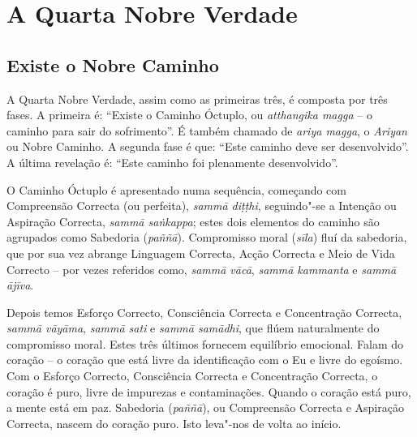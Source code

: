
\chapter{A Quarta Nobre Verdade}

\pagestyle{topbottomcorner}

\section{Existe o Nobre Caminho}

A Quarta Nobre Verdade, assim como as primeiras três, é composta por três fases.
A primeira é: “Existe o Caminho Óctuplo, ou \emph{atthangika magga} – o caminho
para sair do sofrimento”. É também chamado de \emph{ariya magga}, o
\emph{Ariyan} ou Nobre Caminho. A segunda fase é que: “Este caminho deve ser
desenvolvido”. A última revelação é: “Este caminho foi plenamente desenvolvido”.

O Caminho Óctuplo é apresentado numa sequência, começando com Compreensão
Correcta (ou perfeita), \emph{sammā diṭṭhi}, seguindo"-se a Intenção ou Aspiração
Correcta, \emph{sammā saṅkappa}; estes dois elementos do caminho são agrupados
como Sabedoria (\emph{paññā}). Compromisso moral (\emph{sīla}) fluí da
sabedoria, que por sua vez abrange Linguagem Correcta, Acção Correcta e Meio de
Vida Correcto – por vezes referidos como, \emph{sammā vācā}, \emph{sammā
  kammanta} e \emph{sammā ājīva}.

Depois temos Esforço Correcto, Consciência Correcta e Concentração Correcta,
\emph{sammā vāyāma}, \emph{sammā sati} e \emph{sammā samādhi}, que flúem
naturalmente do compromisso moral. Estes três últimos fornecem equilíbrio
emocional. Falam do coração – o coração que está livre da identificação com o Eu
e livre do egoísmo. Com o Esforço Correcto, Consciência Correcta e Concentração
Correcta, o coração é puro, livre de impurezas e contaminações. Quando o coração
está puro, a mente está em paz. Sabedoria (\emph{paññā}), ou Compreensão
Correcta e Aspiração Correcta, nascem do coração puro. Isto leva"-nos de volta ao
início.

